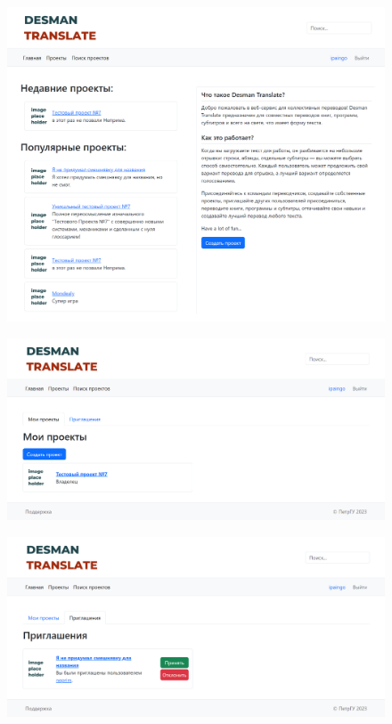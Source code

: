\documentclass[hyperref={unicode}]{beamer}
\begin{document}
\begin{frame}
	\begin{figure}
	\includegraphics[height=0.9\textheight]{images/home.png}
	\end{figure}
\end{frame}

\begin{frame}
	\begin{figure}
	\includegraphics[height=0.4\textheight]{images/myprojects.png}
	\end{figure}
	\begin{figure}
	\includegraphics[height=0.4\textheight]{images/invite.png}
	\end{figure}
\end{frame}
\end{document}
